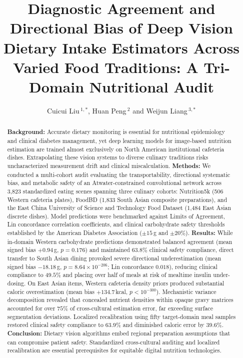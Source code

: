 \documentclass[utf8]{FrontiersinVancouver}
\def\firstAuthorLast{Liu {et~al.}}
\def\Authors{Cuicui Liu\,$^{1,*}$, Huan Peng\,$^{2}$ and Weijun Liang\,$^{3,*}$}
\begin{document}
\onecolumn
{}

\title[Dietary Vision Bias Across Traditions]{Diagnostic Agreement and Directional Bias of Deep Vision Dietary Intake Estimators Across Varied Food Traditions: A Tri-Domain Nutritional Audit}

\author[\firstAuthorLast]{\Authors}
\address{}
\correspondance{}
\extraAuth{}

\maketitle

\begin{abstract}
\textbf{Background:} Accurate dietary monitoring is essential for nutritional epidemiology and clinical diabetes management, yet deep learning models for image-based nutrition estimation are trained almost exclusively on North American institutional cafeteria dishes. Extrapolating these vision systems to diverse culinary traditions risks uncharacterized measurement drift and clinical miscalculation. \textbf{Methods:} We conducted a multi-cohort audit evaluating the transportability, directional systematic bias, and metabolic safety of an Atwater-constrained convolutional network across 3,823 standardized eating scenes spanning three culinary cohorts: Nutrition5k (506 Western cafeteria plates), FoodBD (1,833 South Asian composite preparations), and the East China University of Science and Technology Food Dataset (1,484 East Asian discrete dishes). Model predictions were benchmarked against Limits of Agreement, Lin concordance correlation coefficients, and clinical carbohydrate safety thresholds established by the American Diabetes Association ($\pm 15$\,g and $\pm 20\%$). \textbf{Results:} While in-domain Western carbohydrate predictions demonstrated balanced agreement (mean signed bias $+0.94$\,g, $p = 0.176$) and maintained $63.8\%$ clinical safety compliance, direct transfer to South Asian dining provoked severe directional underestimation (mean signed bias $-18.18$\,g, $p = 8.64 \times 10^{-206}$; Lin concordance $0.018$), reducing clinical compliance to $49.5\%$ and placing over half of meals at risk of mealtime insulin under-dosing. On East Asian items, Western cafeteria density priors produced substantial caloric overestimation (mean bias $+134.7$\,kcal, $p < 10^{-300}$). Mechanistic variance decomposition revealed that concealed nutrient densities within opaque gravy matrices accounted for over $75\%$ of cross-cultural estimation error, far exceeding surface segmentation deviations. Localized recalibration using fifty target-domain meal samples restored clinical safety compliance to $63.9\%$ and diminished caloric error by $39.6\%$. \textbf{Conclusion:} Dietary vision algorithms embed regional preparation assumptions that can compromise patient safety. Standardized cross-cultural auditing and localized recalibration are essential prerequisites for equitable digital nutrition technologies.


\end{abstract}
\end{document}
